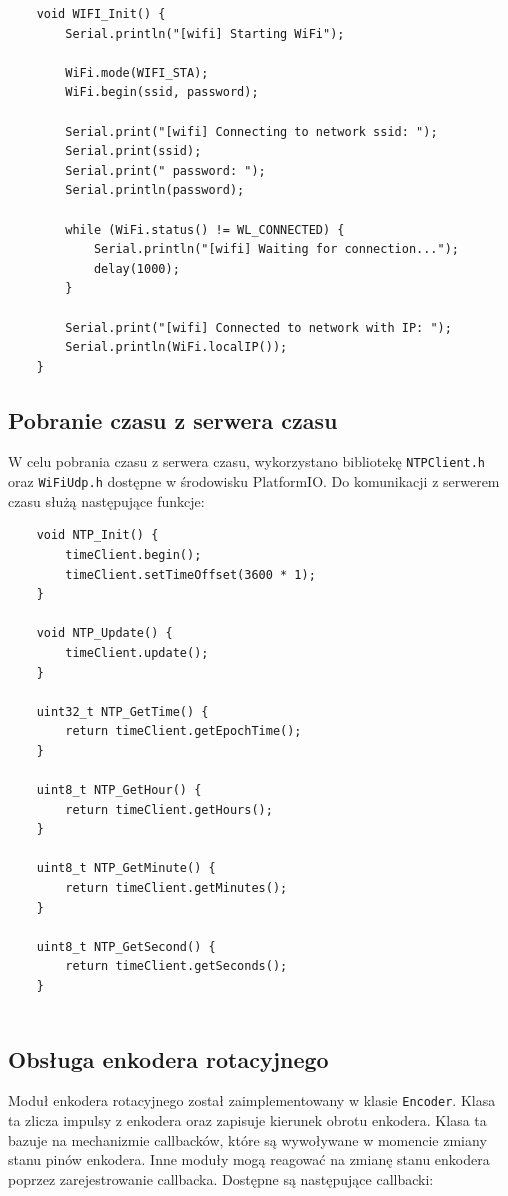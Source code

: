 \documentclass[../main.tex]{subfiles}
\begin{document}
\begin{verbatim}
    void WIFI_Init() {
        Serial.println("[wifi] Starting WiFi");
    
        WiFi.mode(WIFI_STA);
        WiFi.begin(ssid, password);
    
        Serial.print("[wifi] Connecting to network ssid: ");
        Serial.print(ssid);
        Serial.print(" password: ");
        Serial.println(password);
    
        while (WiFi.status() != WL_CONNECTED) {
            Serial.println("[wifi] Waiting for connection...");
            delay(1000);
        }
    
        Serial.print("[wifi] Connected to network with IP: ");
        Serial.println(WiFi.localIP());
    }
\end{verbatim}

\subsection{Pobranie czasu z serwera czasu}
W celu pobrania czasu z serwera czasu, wykorzystano bibliotekę \texttt{NTPClient.h} oraz \texttt{WiFiUdp.h} dostępne w środowisku PlatformIO.
Do komunikacji z serwerem czasu służą następujące funkcje:

\begin{verbatim}
    void NTP_Init() {
        timeClient.begin();
        timeClient.setTimeOffset(3600 * 1);
    }
    
    void NTP_Update() {
        timeClient.update();
    }
    
    uint32_t NTP_GetTime() {
        return timeClient.getEpochTime();
    }
    
    uint8_t NTP_GetHour() {
        return timeClient.getHours();
    }
    
    uint8_t NTP_GetMinute() {
        return timeClient.getMinutes();
    }
    
    uint8_t NTP_GetSecond() {
        return timeClient.getSeconds();
    }
    
\end{verbatim}

\subsection{Obsługa enkodera rotacyjnego}
Moduł enkodera rotacyjnego został zaimplementowany w klasie \texttt{Encoder}. Klasa ta zlicza impulsy z enkodera oraz zapisuje kierunek obrotu enkodera.
Klasa ta bazuje na mechanizmie callbacków, które są wywoływane w momencie zmiany stanu pinów enkodera. Inne moduły mogą reagować na zmianę stanu enkodera poprzez zarejestrowanie callbacka.
Dostępne są następujące callbacki:
\end{document}
